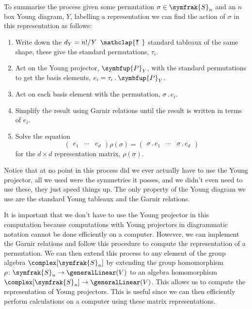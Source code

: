 \documentclass[fleqn]{NotesClass}
\newcommand{\symmetricGroup}[1][n]{\symfrak{S}_{#1}}
\newcommand{\action}{\mathbin{.}}
\newcommand{\projector}[1]{\symbfup{P}_{#1}}
\newcommand{\hooknumber}[1]{#1{\phantom{?}\mkern1mu\mathclap{\ooalign{\hfil ? \hfil \cr \hfil ! \hfil}}}}
\renewcommand{\ve}[1]{e_{#1}}
\begin{document}
    To summarise the process given some permutation \(\sigma \in \symmetricGroup\) and an \(n\) box Young diagram, \(Y\), labelling a representation we can find the action of \(\sigma\) in this representation as follows:
    \begin{enumerate}
        \item Write down the \(d_Y = n!/\hooknumber{Y}\) standard tableaux of the same shape, these give the standard permutations, \(\tau_i\).
        \item Act on the Young projector, \(\projector{Y}\), with the standard permutations to get the basis elements, \(\ve{i} = \tau_i \action \projector{Y}\).
        \item Act on each basis element with the permutation, \(\sigma \action \ve{i}\).
        \item Simplify the result using Garnir relations until the result is written in terms of \(\ve{i}\).
        \item Solve the equation
        \begin{equation}
            \begin{pmatrix}
                \ve{1} & \cdots & \ve{d}
            \end{pmatrix}
            \rho(\sigma) = 
            \begin{pmatrix}
                \sigma \action \ve{1} & \cdots & \sigma \action \ve{d}
            \end{pmatrix}
        \end{equation}
        for the \(d \times d\) representation matrix, \(\rho(\sigma)\).
    \end{enumerate}
    
    Notice that at no point in this process did we ever actually have to use the Young projector, all we used were the symmetries it posses, and we didn't even need to use these, they just speed things up.
    The only property of the Young diagram we use are the standard Young tableaux and the Garnir relations.
    
    It is important that we don't have to use the Young projector in this computation because computations with Young projectors in diagrammatic notation cannot be done efficiently on a computer.
    However, we can implement the Garnir relations and follow this procedure to compute the representation of a permutation.
    We can then extend this process to any element of the group algebra \(\complex[\symmetricGroup]\) by extending the group homomorphism \(\rho\colon \symmetricGroup \to \generalLinear(V)\) to an algebra homomorphism \(\complex[\symmetricGroup] \to \generalLinear(V)\).
    This allows us to compute the representation of Young projectors.
    This is useful since we can then efficiently perform calculations on a computer using these matrix representations.
    
\end{document}
